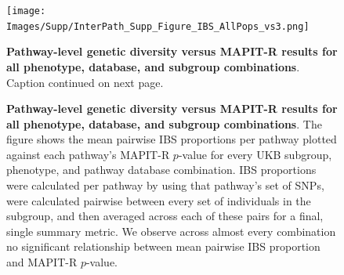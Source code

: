 \documentclass[12pt,a4paper]{article}
\def\log{{\rm log}}
\begin{document}

\setlength{\footskip}{3cm}
\begin{figure}[htbp]
\centering
\vspace*{-2cm}
\texttt{[image: Images/Supp/InterPath\_Supp\_Figure\_IBS\_AllPops\_vs3.png]}
\caption[TBD]{\textbf{Pathway-level genetic diversity versus MAPIT-R results for all phenotype, database, and subgroup combinations}. Caption continued on next page.}
\label{InterPath-Supp-Figure-IBS-AllPops}
\end{figure}
\clearpage
\setlength{\footskip}{1cm}
\addtocounter{figure}{-1}

\begin{figure} [t!]
\caption[TBD]{\textbf{Pathway-level genetic diversity versus MAPIT-R results for all phenotype, database, and subgroup combinations}. The figure shows the mean pairwise IBS proportions per pathway plotted against each pathway's MAPIT-R $p$-value for every UKB subgroup, phenotype, and pathway database combination. IBS proportions were calculated per pathway by using that pathway's set of SNPs, were calculated pairwise between every set of individuals in the subgroup, and then averaged across each of these pairs for a final, single summary metric. We observe across almost every combination no significant relationship between mean pairwise IBS proportion and MAPIT-R $p$-value.}
\label{InterPath-Supp-Figure-IBS-AllPops-Caption}
\end{figure}
\clearpage
\end{document}
